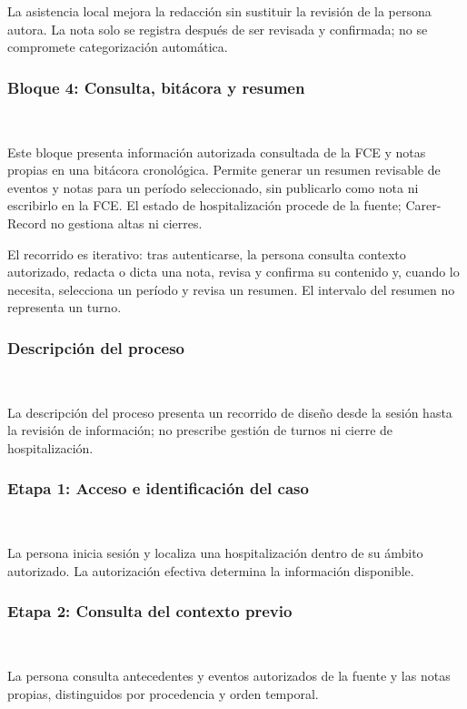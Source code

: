 La asistencia local mejora la redacción sin sustituir la revisión de la persona autora. La nota solo se registra después de ser revisada y confirmada; no se compromete categorización automática.\\

\subsubsection*{Bloque 4: Consulta, bitácora y resumen} ~

Este bloque presenta información autorizada consultada de la FCE y notas propias en una bitácora cronológica. Permite generar un resumen revisable de eventos y notas para un período seleccionado, sin publicarlo como nota ni escribirlo en la FCE. El estado de hospitalización procede de la fuente; Carer-Record no gestiona altas ni cierres.

El recorrido es iterativo: tras autenticarse, la persona consulta contexto autorizado, redacta o dicta una nota, revisa y confirma su contenido y, cuando lo necesita, selecciona un período y revisa un resumen. El intervalo del resumen no representa un turno.\\

\subsubsection*{Descripción del proceso} ~

La descripción del proceso presenta un recorrido de diseño desde la sesión hasta la revisión de información; no prescribe gestión de turnos ni cierre de hospitalización.\\

\subsubsection*{Etapa 1: Acceso e identificación del caso} ~

La persona inicia sesión y localiza una hospitalización dentro de su ámbito autorizado. La autorización efectiva determina la información disponible.\\

\subsubsection*{Etapa 2: Consulta del contexto previo} ~

La persona consulta antecedentes y eventos autorizados de la fuente y las notas propias, distinguidos por procedencia y orden temporal.\\

